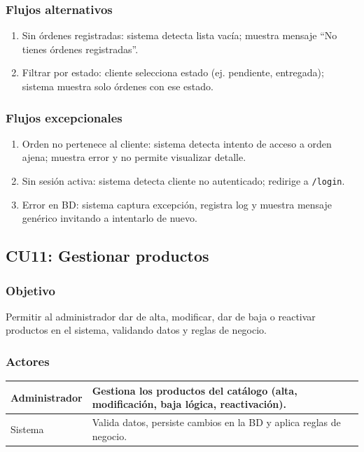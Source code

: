 \documentclass[12pt,a4paper]{article}
\begin{document}
\subsubsection*{Flujos alternativos}
\begin{enumerate}[label=FA-\arabic*]
    \item Sin órdenes registradas: sistema detecta lista vacía; muestra mensaje “No tienes órdenes registradas”.
    \item Filtrar por estado: cliente selecciona estado (ej. pendiente, entregada); sistema muestra solo órdenes con ese estado.
\end{enumerate}

\subsubsection*{Flujos excepcionales}
\begin{enumerate}[label=FE-\arabic*]
    \item Orden no pertenece al cliente: sistema detecta intento de acceso a orden ajena; muestra error y no permite visualizar detalle.
    \item Sin sesión activa: sistema detecta cliente no autenticado; redirige a \texttt{/login}.
    \item Error en BD: sistema captura excepción, registra log y muestra mensaje genérico invitando a intentarlo de nuevo.
\end{enumerate}


\subsection{CU11: Gestionar productos}
\subsubsection*{Objetivo}
Permitir al administrador dar de alta, modificar, dar de baja o reactivar productos en el sistema, validando datos y reglas de negocio.

\subsubsection*{Actores}
\begin{longtable}{|l|p{10cm}|}
    \hline
    Administrador & Gestiona los productos del catálogo (alta, modificación, baja lógica, reactivación). \\ \hline
    Sistema       & Valida datos, persiste cambios en la BD y aplica reglas de negocio.                  \\ \hline
\end{longtable}
\end{document}

